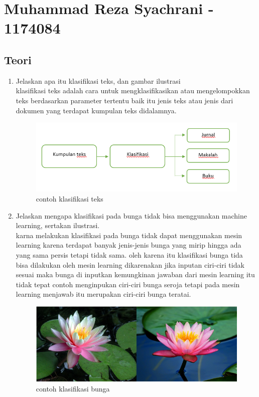 \section{Muhammad Reza Syachrani - 1174084}
\subsection{Teori}
\begin{enumerate}
	\item Jelaskan apa itu klasifikasi teks, dan gambar ilustrasi
	\hfill\\
klasifikasi teks adalah cara untuk mengklasifikasikan atau mengelompokkan teks berdasarkan parameter tertentu baik itu jenis teks atau jenis dari dokumen yang terdapat kumpulan teks didalamnya. 
\begin{figure}[H]
    \includegraphics[width=12cm]{figures/1174084/4/teori1.png}
    \centering
    \caption{contoh klasifikasi teks}
\end{figure}

\item Jelaskan mengapa klasifikasi pada bunga tidak bisa menggunakan machine learning, sertakan ilustrasi.
	\hfill\\
	karna melakukan klasifikasi pada bunga tidak dapat menggunakan mesin learning karena terdapat banyak jenis-jenis bunga yang mirip hingga ada yang sama persis tetapi tidak sama. oleh karena itu klasifikasi bunga tida bisa dilakukan oleh mesin learning dikarenakan jika inputan ciri-ciri tidak sesuai maka bunga di inputkan kemungkinan jawaban dari mesin learning itu tidak tepat contoh menginpukan ciri-ciri bunga seroja tetapi pada mesin learning menjawab itu merupakan ciri-ciri bunga teratai.

\begin{figure}[H]
    \includegraphics[width=12cm]{figures/1174084/4/teori2.png}
    \centering
    \caption{contoh klasifikasi bunga}
\end{figure}


\end{enumerate}

